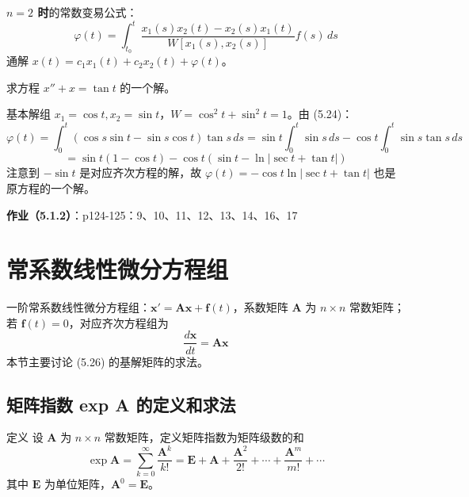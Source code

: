\textbf{$n = 2$ 时}的常数变易公式：
\begin{equation}\varphi(t) = \int_{t_0}^{t} \frac{x_1(s)x_2(t) - x_2(s)x_1(t)}{W[x_1(s), x_2(s)]}f(s)\,ds \tag{5.24}\end{equation}
通解 $x(t) = c_1x_1(t) + c_2x_2(t) + \varphi(t)$。

\begin{example}
求方程 $x'' + x = \tan t$ 的一个解。
\end{example}

\begin{solution}
基本解组 $x_1 = \cos t, x_2 = \sin t$，$W = \cos^2 t + \sin^2 t = 1$。由 (5.24)：
$$\varphi(t) = \int_0^t (\cos s\sin t - \sin s\cos t)\tan s\,ds = \sin t\int_0^t \sin s\,ds - \cos t\int_0^t \sin s\tan s\,ds$$
$$= \sin t(1 - \cos t) - \cos t(\sin t - \ln|\sec t + \tan t|)$$
注意到 $-\sin t$ 是对应齐次方程的解，故 $\varphi(t) = -\cos t\ln|\sec t + \tan t|$ 也是原方程的一个解。
\end{solution}

\textbf{作业（5.1.2）}：p124-125：9、10、11、12、13、14、16、17

\section{常系数线性微分方程组}

一阶常系数线性微分方程组：$\mathbf{x}' = \mathbf{A}\mathbf{x} + \mathbf{f}(t)$，系数矩阵 $\mathbf{A}$ 为 $n\times n$ 常数矩阵；若 $\mathbf{f}(t) = 0$，对应齐次方程组为
\begin{equation}\frac{d\mathbf{x}}{dt} = \mathbf{A}\mathbf{x} \tag{5.26}\end{equation}
本节主要讨论 (5.26) 的基解矩阵的求法。

\subsection{矩阵指数 exp A 的定义和求法}

\begin{mydefinition}{定义}
设 $\mathbf{A}$ 为 $n\times n$ 常数矩阵，定义矩阵指数为矩阵级数的和
\begin{equation}\exp\mathbf{A} = \sum_{k=0}^{\infty}\frac{\mathbf{A}^k}{k!} = \mathbf{E} + \mathbf{A} + \frac{\mathbf{A}^2}{2!} + \cdots + \frac{\mathbf{A}^m}{m!} + \cdots \tag{5.27}\end{equation}
其中 $\mathbf{E}$ 为单位矩阵，$\mathbf{A}^0 = \mathbf{E}$。
\end{mydefinition}

